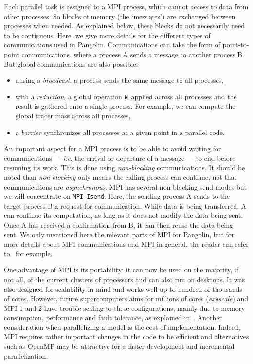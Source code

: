 Each parallel task is assigned to a MPI process, which cannot access to data
from other processes. So blocks of memory (the `messages') are exchanged between
processes when needed. As explained below, these blocks do not necessarily need
to be contiguous. Here, we give more details for the different types of
communications used in Pangolin. Communications can take the form of
point-to-point communications, where a process A sends a message to another
process B. But global communications are also possible:
\begin{itemize}
  \item during a \textit{broadcast}, a process sends the same message to all
    processes,
  \item with a \textit{reduction}, a global operation is applied across all
    processes and the result is gathered onto a single process. For example, we can compute
    the global tracer mass across all processes,
  \item a \textit{barrier} synchronizes all processes at a given point
    in a parallel code.
\end{itemize}

An important aspect for a MPI process is to be able to avoid waiting for
communications --- \textit{i.e}, the arrival or departure of a message --- to end
before resuming its work. This is done using \textit{non-blocking}
communications. It should be noted than \textit{non-blocking} only means the
calling process can continue, not that communications are \textit{asynchronous}.
MPI has several non-blocking send modes but we will concentrate on
\texttt{MPI\_Isend}. Here, the sending process A sends to the target process
B a request for communication. While data is being transferred, A can continue
its computation, as long as it does not modify the data being sent. Once A has
received a confirmation from B, it can then reuse the data being sent. We only
mentioned here the relevant parts of MPI for Pangolin, but for more details
about MPI communications and MPI in general, the reader can refer
to~\cite{Gropp1999} for example.

One advantage of MPI is its portability: it can now be used on the majority, if not
all, of the current clusters of processors and can also run on desktops. It was
also designed for scalability in mind and works well up to hundred of thousands
of cores. However, future supercomputers aims for millions of cores
(\textit{exascale}) and MPI 1 and 2 have trouble scaling to these configurations,
mainly due to memory consumption, performance and fault tolerance, as explained
in~\cite{Thakur2010}. Another consideration when parallelizing a model is the
cost of implementation. Indeed, MPI requires rather important changes in the code
to be efficient and alternatives such as OpenMP may be attractive for a faster
development and incremental parallelization.

